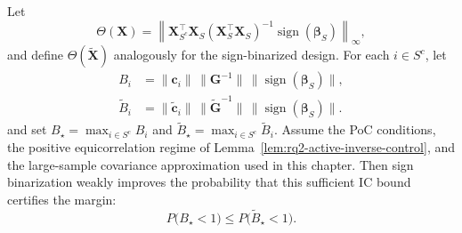 \begin{theorem}\label{thm:rq2-ic-probability}
Let
\begin{equation}\label{eq:rq2-theta-definition}
\Theta(\mathbf{X}) = \left\|\mathbf{X}_{S^c}^{\top}\mathbf{X}_S(\mathbf{X}_S^{\top}\mathbf{X}_S)^{-1}\operatorname{sign}(\boldsymbol{\beta}_S)\right\|_\infty,
\end{equation}
and define $\Theta(\tilde{\mathbf{X}})$ analogously for the sign-binarized design. For each $i\in S^c$, let
\begin{align}
B_i
&=\|\mathbf{c}_i\|\,\|\mathbf{G}^{-1}\|\,\|\operatorname{sign}(\boldsymbol{\beta}_S)\|,
\label{eq:rq2-raw-ic-bound}\\
\tilde{B}_i
&=\|\tilde{\mathbf{c}}_i\|\,\|\tilde{\mathbf{G}}^{-1}\|\,\|\operatorname{sign}(\boldsymbol{\beta}_S)\|.
\label{eq:rq2-binarized-ic-bound}
\end{align}
and set $B_\star=\max_{i\in S^c}B_i$ and $\tilde{B}_\star=\max_{i\in S^c}\tilde{B}_i$.
Assume the PoC conditions, the positive equicorrelation regime of Lemma~\ref{lem:rq2-active-inverse-control}, and the large-sample covariance approximation used in this chapter. Then sign binarization weakly improves the probability that this sufficient IC bound certifies the margin:
\begin{equation}\label{eq:rq2-theta-probability-improvement}
P\big(B_\star<1\big) \leq P\big(\tilde{B}_\star<1\big).
\end{equation}
\end{theorem}

